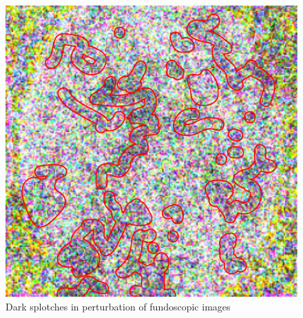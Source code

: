\begin{figure}[h]
    \centering
    \includegraphics[width=0.5\linewidth]{graphics/ResNet-50/cotton_wool.pdf}
    \caption{Dark splotches in perturbation of fundoscopic images}
    \label{CottonWool}
  \end{figure}